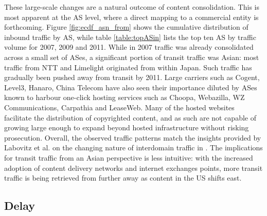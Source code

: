 

These large-scale changes are a natural outcome of content consolidation. This is most apparent at the AS level, where a direct mapping to a commercial entity is forthcoming.
Figure \ref{fig:ecdf_asn_from} shows the cumulative distribution of inbound traffic by AS, while table \ref{table:topASin} lists the top ten AS by traffic volume for 2007, 2009 and 2011.
While in 2007 traffic was already consolidated across a small set of ASes, a significant portion of transit traffic was Asian: most traffic from NTT and Limelight originated from within Japan. Such traffic has gradually been pushed away from transit by 2011.
Large carriers such as Cogent, Level3, Hanaro, China Telecom have also seen their importance diluted by ASes known to harbour one-click hosting services such as Choopa, Webazilla, WZ Communications, Carpathia and LeaseWeb.
Many of the hosted websites facilitate the distribution of copyrighted content, and as such are not capable of growing large enough to expand beyond hosted infrastructure without risking prosecution.
Overall, the observed traffic patterns match the insights provided by Labovitz et al. on the changing nature of interdomain traffic in \cite{Labovitz:2010p175}.
The implications for transit traffic from an Asian perspective is less intuitive: with the increased adoption of content delivery networks and internet exchanges points, more transit traffic is being retrieved from further away as content in the US shifts east.

\subsection{Delay}


